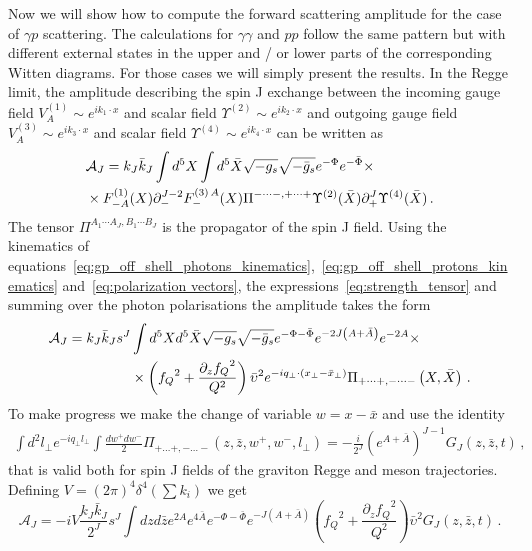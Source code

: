 \documentclass[a4paper,12pt]{article}
\begin{document}
Now we will show how to compute the forward scattering amplitude for the case of $\gamma p$ scattering. The calculations for $\gamma \gamma$ and $pp$ follow the same pattern but with different external states in the upper and / or lower parts of the corresponding Witten diagrams. For those cases we will simply present the results. In the Regge limit, the amplitude describing the spin J exchange between the incoming gauge field $V_A^{(1)} \sim  e^{i k_1 \cdot x}$ and scalar field $\Upsilon^{(2)} \sim  e^{i k_2 \cdot x}$ and outgoing gauge field $V_A^{(3)} \sim  e^{i k_3 \cdot x}$ and scalar field $\Upsilon^{(4)} \sim  e^{i k_4 \cdot x}$ can be written as
\begin{align}
&\mathcal{A}_J = k_J \bar{k}_J \int d^5 X \int d^5 \bar{X} \sqrt{-g_s} \sqrt{-\bar{g}_s} e^{-\Phi} e^{-\bar{\Phi}}  \times \notag \\ 
& \times  F^{(1)}_{-A } (X) \partial_{-}^{J-2}F^{(3) \, A}_{-} (X) \Pi^{- \cdots -, + \cdots +}  \Upsilon^{(2)}(\bar{X}) \partial_{+}^J \Upsilon^{(4)}(\bar{X}) \, .
\end{align}
The tensor $\Pi^{A_1 \cdots A_J, B_1 \cdots B_J}$ is the propagator of the spin J field. Using the kinematics of equations~\ref{eq:gp_off_shell_photons_kinematics},~\ref{eq:gp_off_shell_protons_kinematics} and~\ref{eq:polarization vectors}, the expressions~\ref{eq:strength_tensor} and summing over the photon polarisations the amplitude takes the form
\begin{align}
  \mathcal{A}_J = k_J \bar{k}_J s^J & \int d^5X d^5 \bar{X} \sqrt{-g_s} \sqrt{-\bar{g}_s}  e^{ - \Phi -\bar{\Phi}} e^{-2 J \left(A+\bar{A}\right)}  e^{-2A}  \times \notag \\
  &\times \left(  {f_Q}^2 + \frac{{\partial_z f_Q}^2}{Q^2}  \right) {\bar{\upsilon}}^2 e^{-i q_\perp \cdot \left( x_\perp - \bar{x}_\perp \right)} \Pi _{+\dots+,-\dots-}\left(X, \bar{X} \right) \, .
\end{align}
To make progress we make the change of variable $w = x - \bar{x}$ and use the identity
\begin{align}
 \int d^2 l_\perp e^{- i q_\perp l_\perp} \int \frac{dw^+ dw^-}{2} \Pi_{+ \dots +, - \dots -} \left(z, \bar{z}, w^+, w^-, l_\perp \right) = - \frac{i}{2^J} {\left( e^{A + \bar{A}} \right)}^{J-1}G_J \left(z, \bar{z}, t\right) \, ,
\label{eq:gJ_t_def}
\end{align}
that is valid both for spin J fields of the graviton Regge and meson trajectories. Defining $V = {\left(2 \pi\right)}^4 \delta^4\left( \sum k_i \right)$ we get
\begin{equation}
  \mathcal{A}_J = - i V \frac{k_J \bar{k}_J}{2^J} s^J \int dz d\bar{z} e^{2 A}e^{4 \bar{A}} e^{ -\Phi -\bar{\Phi}} e^{-J \left(A+\bar{A}\right)} \left(  {f_Q}^2 + \frac{{\partial_z f_Q}^2}{Q^2}  \right)  {\bar{\upsilon}}^2 G_J \left(z, \bar{z}, t\right) \, .
\end{equation}
\end{document}
